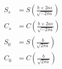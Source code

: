 \begin{align}
S_s &= S\left(\frac{b + 2as}{\sqrt{-2\pi a}}\right) \\
C_s &= C\left(\frac{b + 2as}{\sqrt{-2\pi a}}\right) \\
S_0 &= S\left(\frac{b}{\sqrt{2\pi a}}\right) \\
C_0 &= C\left(\frac{b}{\sqrt{2\pi a}}\right)
\end{align}


























